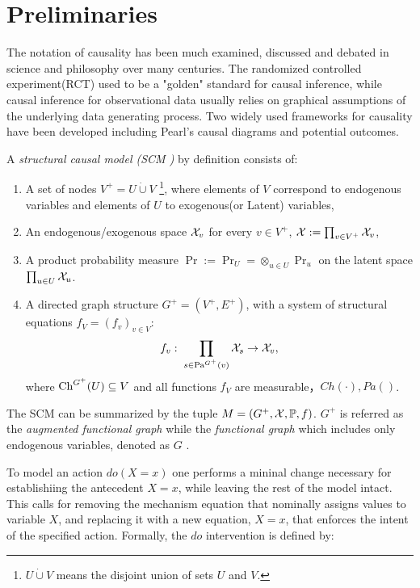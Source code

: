 \section{Preliminaries}

 
The notation of causality has been much examined, discussed and debated in science and philosophy over many centuries. The randomized controlled experiment(RCT) used to be a "golden" standard for causal inference, while causal inference for observational data usually relies on graphical assumptions of the underlying data generating process. Two widely used frameworks for causality have been developed including Pearl's causal diagrams and potential outcomes.


\begin{Def}
	\label{SCM-def}
	A \emph{structural causal model (SCM \cite{Pearl2009, Pearl2018})} by definition consists of: 
	\begin{enumerate}
		\setlength\itemsep{0em}
		\item A set of nodes $V^+=U \dot \cup V$ \footnote{$U \dot \cup V$ means the disjoint union of sets $U$ and $V$.}, where elements of $V$ correspond to endogenous variables and elements of $U$ to exogenous(or Latent) variables,
		\item An endogenous/exogenous space $\mathcal{X}_v$ for every $v \in V^+$, $\mathcal{X}:=\prod_{v \in V^+}\mathcal{X}_v$,
		\item A product probability measure $\Pr:=\Pr_U=\otimes_{u \in U} \Pr_u$ on the latent space $\prod_{u \in U} \mathcal{X}_u$. 
		
		\item A directed graph structure $G^+=(V^+, E^+)$, with a system of structural equations  $f_V = (f_v)_{v \in V}$:
		\[f_v: \; \prod_{s \in  \mathrm{Pa}^{G^+}(v)}\mathcal{X}_s \to \mathcal{X}_v,\]
		where $\mathrm{Ch}^{G^+}(U) \subseteq V$ and all functions $f_V$ are measurable，$Ch(\cdot ), Pa()$. 
	\end{enumerate}
	The SCM can be summarized by the tuple $M=(G^+,\mathcal{X},\mathbb{P}, f)$. $G^+$ is referred as the \emph{augmented functional graph} while the \emph{functional graph} which includes only endogenous variables, denoted as $G$ . 
\end{Def}


To model an action $do(X=x)$ one performs a mininal change necessary for establishiing the antecedent $X=x$, while leaving the rest of the model intact. This calls for removing the mechanism equation that nominally assigns values to variable $X$, and replacing it with a new equation, $X=x$, that enforces the intent of the specified action.  Formally, the $do$ intervention is defined by:

